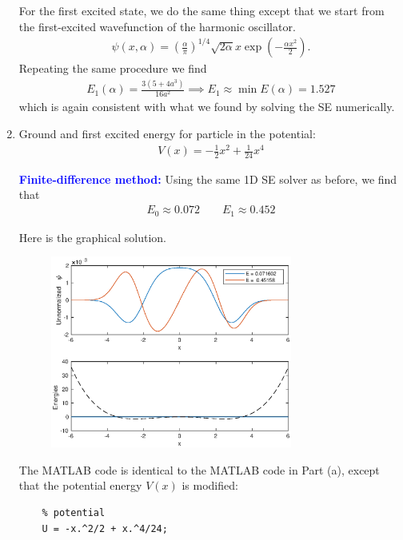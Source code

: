 \documentclass{article}
\theoremstyle{definition}
\newcommand{\al}{\alpha}
\newcommand{\f}[2]{\frac{#1}{#2}}
\newcommand{\lp}{\left(}
\newcommand{\rp}{\right)}
\begin{document}
\begin{enumerate}[label=(\alph*)]
	For the first excited state, we do the same thing except that we start from the first-excited wavefunction of the harmonic oscillator. 
	\begin{align*}
	\psi(x,\al) = \lp \f{\al}{\pi} \rp^{1/4}\sqrt{2 \al} x \exp\lp -\f{\al x^2}{2} \rp.
	\end{align*}
	Repeating the same procedure we find 
	\begin{align*}
	\boxed{E_1(\al) = \f{3(5+4a^3)}{16a^2} \implies E_1 \approx \min E(\al) =   1.527}
	\end{align*}
	which is again consistent with what we found by solving the SE numerically. 
	
	
	
	
	
	\item Ground and first excited energy for particle in the potential:
	\begin{align*}
	V(x) = -\f{1}{2}x^2 + \f{1}{24}x^4
	\end{align*}
	
	\textbf{\textcolor{blue}{Finite-difference method:}} Using the same 1D SE solver as before, we find that
	\begin{align*}
	\boxed{E_0 \approx 0.072} \quad\quad \boxed{E_1 \approx 0.452}
	\end{align*}
	
	Here is the graphical solution. 
	\begin{figure}[!htb]
		\centering
		\includegraphics[width=0.75\textwidth]{problem3b.eps}
	\end{figure}
	
	
	The MATLAB code is identical to the MATLAB code in Part (a), except that the potential energy $V(x)$ is modified:
	\begin{lstlisting}
	% potential
	U = -x.^2/2 + x.^4/24;
	\end{lstlisting}
	

\end{enumerate}
\end{document}
